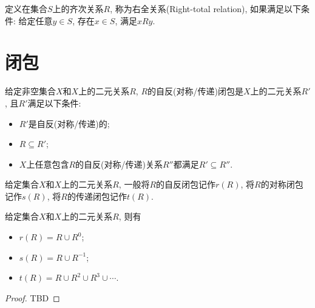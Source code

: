 \begin{definition}[右全关系]
	定义在集合$S$上的齐次关系$R$, 称为右全关系(Right-total relation), 如果满足以下条件: 给定任意$y\in S$, 存在$x\in S$, 满足$xRy$.
\end{definition}

\section{闭包}
\begin{definition}
	给定非空集合$X$和$X$上的二元关系$R$, $R$的自反(对称/传递)闭包是$X$上的二元关系$R'$, 且$R'$满足以下条件:
	\begin{itemize}
		\item $R'$是自反(对称/传递)的;
		\item $R\subseteq R'$;
		\item $X$上任意包含$R$的自反(对称/传递)关系$R''$都满足$R'\subseteq R''$.
	\end{itemize}
\end{definition}

给定集合$X$和$X$上的二元关系$R$, 一般将$R$的自反闭包记作$r(R)$, 将$R$的对称闭包记作$s(R)$, 将$R$的传递闭包记作$t(R)$.

\begin{proposition}
	给定集合$X$和$X$上的二元关系$R$, 则有
	\begin{itemize}
		\item $r(R)=R\cup R^0$;
		\item $s(R)=R\cup R^{-1}$;
		\item $t(R)=R\cup R^2\cup R^3\cup \cdots$.
	\end{itemize}
\end{proposition}

\begin{proof}
	TBD
\end{proof}

